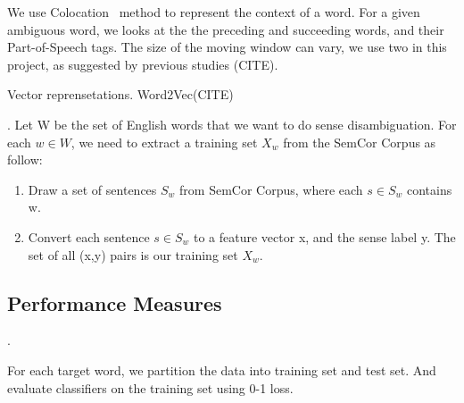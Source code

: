 We use Colocation~\cite{colocation} method to represent the context of a word.
For a given ambiguous word, we looks at the the preceding and succeeding words,
and their Part-of-Speech tags.
The size of the moving window can vary, we use two in this project, as suggested
by previous studies (CITE).
\begin{equation}
  [w_{i-2},POS_{i-2},w_{i-1},POS_{i-1},w_{i+1},POS_{i+1},w_{i+1},POS_{i+1}]
\end{equation}

Vector reprensetations.
Word2Vec(CITE)

.
Let W be the set of English words that we want to do sense disambiguation. For
each $w \in W$, we need to extract a training set $X_w$ from the SemCor Corpus
as follow: 
\begin{enumerate}
  \item Draw a set of sentences $S_w$ from SemCor Corpus, where each 
$s \in S_w$ contains w. 
  \item Convert each sentence $s \in S_w$ to a feature vector x, and the sense
    label y. The set of all (x,y) pairs is our training set $X_w$.
\end{enumerate}

\subsection{Performance Measures}. 

For each target word, we partition the data into training set and test set. 
And evaluate classifiers on the training set using 0-1 loss.
